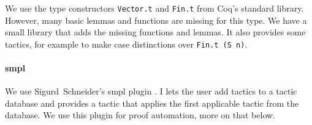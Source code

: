We use the type constructors \lstinline!Vector.t! and \lstinline!Fin.t! from Coq's standard library.  However, many basic lemmas and functions are
missing for this type.  We have a small library that adds the missing functions and lemmas.  It also provides some tactics, for example to make case
distinctions over \lstinline!Fin.t (S n)!.

\paragraph{smpl}

We use Sigurd~Schneider's smpl plugin \cite{SMPL}.  I lets the user add tactics to a tactic database and provides a tactic that applies the first
applicable tactic from the database.  We use this plugin for proof automation, more on that below.





